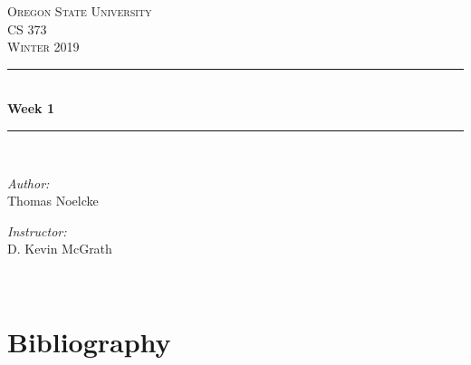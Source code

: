 \documentclass[letterpaper, onecolumn,10pt]{IEEEtran}
\begin{document}
    \begin{titlepage}
    \newcommand{\HRule}{\rule{\linewidth}{0.5mm}}
    \center
    \textsc{\Large Oregon State University}\\[1.5cm]
    \textsc{\Large CS 373}\\[0.5cm]
    \textsc{\Large Winter 2019}\\[0.5cm]
    \HRule \\[0.4cm]
    { \huge \bfseries Week 1}\\[0.4cm] %
    \HRule \\[1.5cm]
    \begin{minipage}{0.4\textwidth}
        \begin{flushleft} \large
        \emph{Author:}\\
        Thomas Noelcke
        \end{flushleft}
    \end{minipage}
    \begin{minipage}{0.4\textwidth}
        \begin{flushright} \large
        \emph{Instructor:} \\
        D. Kevin McGrath\\
        \end{flushright}
    \end{minipage}\\[2cm]
		\end{titlepage}
		
		
		\section{}
			
		\section{}
			
		\section{Bibliography}
		
		
\end{document}

